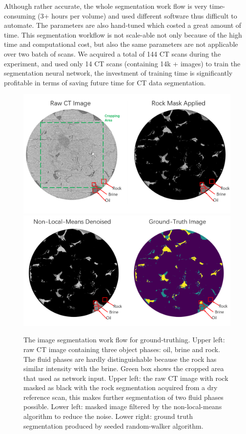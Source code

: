 \documentclass[draft,linenumbers]{agujournal2018}
\begin{document}
Although rather accurate, the whole segmentation work flow is very time-consuming (3+ hours per volume) and used different software thus difficult to automate. The parameters are also hand-tuned which costed a great amount of time. This segmentation workflow is not scale-able not only because of the high time and computational cost, but also the same parameters are not applicable over two batch of scans. We acquired a total of 144 CT scans during the experiment, and used only 14 CT scans (containing 14k + images) to train the segmentation neural network, the investment of training time is significantly profitable in terms of saving future time for CT data segmentation.

\begin{figure}[h]
\centering
\includegraphics[width=33pc]{imgs/raw-masked2.png}
\includegraphics[width=33pc]{imgs/nlm-gt2.png}
\caption{The image segmentation work flow for ground-truthing. Upper left: raw CT image containing three object phases: oil, brine and rock. The fluid phases are hardly distinguishable because the rock has similar intensity with the brine. Green box shows the cropped area that used as network input. Upper left: the raw CT image with rock masked as black with the rock segmentation acquired from a dry reference scan, this makes further segmentation of two fluid phases possible. Lower left: masked image filtered by the non-local-means algorithm to reduce the noise. Lower right: ground truth segmentation produced by seeded random-walker algorithm.}
\label{prep}
\end{figure}
\end{document}

